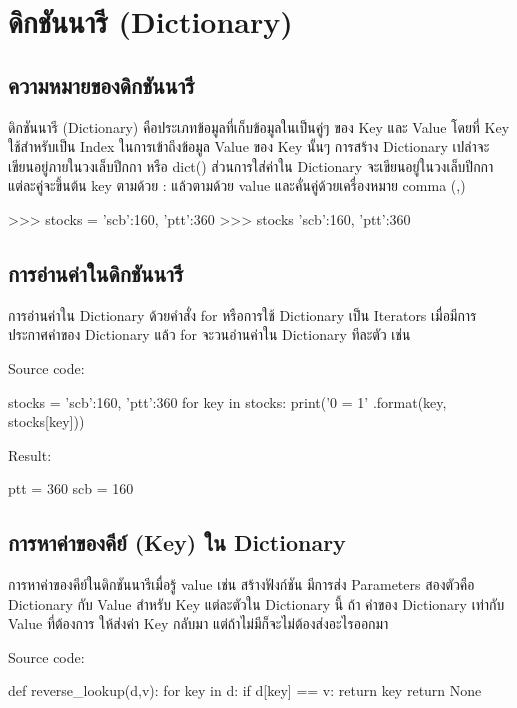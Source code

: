 \chapter{ดิกชันนารี (Dictionary)}
\section{ความหมายของดิกชันนารี}

ดิกชันนารี (Dictionary) คือประเภทข้อมูลที่เก็บข้อมูลในเป็นคู่ๆ ของ Key และ Value โดยที่ Key ใช้สำหรับเป็น Index ในการเข้าถึงข้อมูล Value ของ Key นั้นๆ การสร้าง Dictionary เปล่าจะเขียนอยู่ภายในวงเล็บปีกกา { } หรือ dict() ส่วนการใส่ค่าใน Dictionary จะเขียนอยู่ในวงเล็บปีกกา แต่ละคู่จะขึ้นต้น key ตามด้วย : แล้วตามด้วย value และคั่นคู่ด้วยเครื่องหมาย comma (,) 

\begin{codelist}{}{}
>>> stocks = {'scb':160, 'ptt':360}
>>> stocks
{'scb':160, 'ptt':360}
\end{codelist}


\section{การอ่านค่าในดิกชันนารี}

การอ่านค่าใน Dictionary ด้วยคำสั่ง for หรือการใช้ Dictionary เป็น Iterators เมื่อมีการประกาศค่าของ Dictionary แล้ว for จะวนอ่านค่าใน Dictionary ทีละตัว เช่น 

Source code:
\begin{codelist}{}{}
stocks = {'scb':160, 'ptt':360}
for key in stocks:
    print('{0} = {1}' .format(key, stocks[key]))
\end{codelist}

Result:
\begin{codelist}{}{}
ptt = 360
scb = 160
\end{codelist}


\section{การหาค่าของคีย์ (Key) ใน Dictionary}
การหาค่าของคีย์ในดิกชันนารีเมื่อรู้ value เช่น สร้างฟังก์ชัน  มีการส่ง Parameters สองตัวคือ Dictionary กับ Value สำหรับ Key แต่ละตัวใน Dictionary นี้ ถ้า ค่าของ Dictionary เท่ากับ Value ที่ต้องการ ให้ส่งค่า Key กลับมา แต่ถ้าไม่มีก็จะไม่ต้องส่งอะไรออกมา

Source code:
\begin{codelist}{}{}
def reverse_lookup(d,v):
    for key in d:
        if d[key] == v: return key
    return None
\end{codelist}

